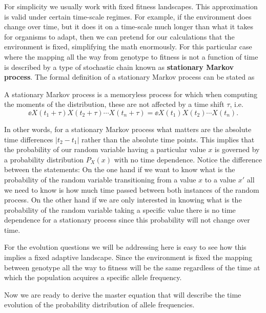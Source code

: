For simplicity we usually work with fixed fitness landscapes. This approximation
is valid under certain time-scale regimes. For example, if the environment does
change over time, but it does it on a time-scale much longer than what it takes
for organisms to adapt, then we can pretend for our calculations that the
environment is fixed, simplifying the math enormously. For this particular case
where the mapping all the way from genotype to fitness is not a function of time
is described by a type of stochastic chain known as \textbf{stationary Markov
process}. The formal definition of a stationary Markov process can be stated as
\begin{tcolorbox}
  A stationary Markov process is a memoryless process for which when computing
  the moments of the distribution, these are not affected by a time shift
  $\tau$, i.e.
  \begin{equation}
    \ee{X(t_1 + \tau) X(t_2 + \tau) \cdots X(t_n + \tau)} =
    \ee{X(t_1) X(t_2) \cdots X(t_n)}.
  \end{equation}
\end{tcolorbox}
In other words, for a stationary Markov process what matters are the absolute
time differences $|t_2 - t_1|$ rather than the absolute time points. This
implies that the probability of our random variable having a particular value
$x$ is governed by a probability distribution $P_X(x)$ with no time dependence.
Notice the difference between the statements: On the one hand if we want to know
what is the probability of the random variable transitioning from a value $x$ to
a value $x'$ all we need to know is how much time passed between both
instances of the random process. On the other hand if we are only interested in
knowing what is the probability of the random variable taking a specific value
there is no time dependence for a stationary process since this probability will
not change over time.

For the evolution questions we will be addressing here is easy to see how this
implies a fixed adaptive landscape. Since the environment is fixed the mapping
between genotype all the way to fitness will be the same regardless of the time
at which the population acquires a specific allele frequency.

Now we are ready to derive the master equation that will describe the time
evolution of the probability distribution of allele frequencies.

